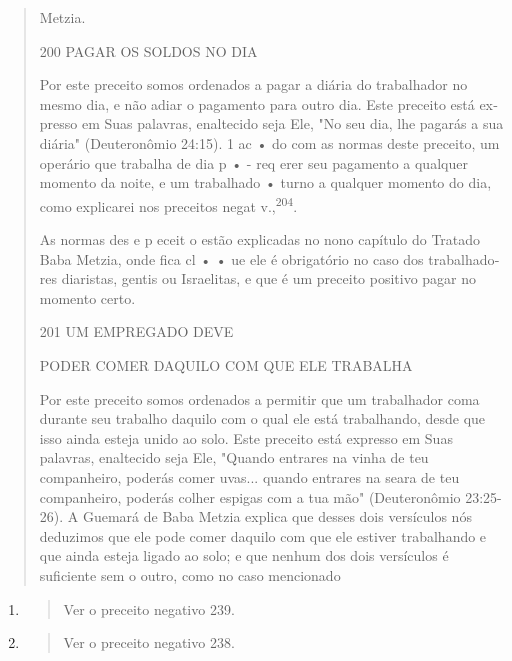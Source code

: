 \begin{quote}
Metzia.

200 PAGAR OS SOLDOS NO DIA

Por este preceito somos ordenados a pagar a diária do trabalhador no
mesmo dia, e não adiar o pagamento para outro dia. Este preceito está
ex­presso em Suas palavras, enaltecido seja Ele, "No seu dia, lhe
pagarás a sua diá­ria" (Deuteronômio 24:15). 1 ac • do com as normas
deste preceito, um ope­rário que trabalha de dia p • - req erer seu
pagamento a qualquer momento da noite, e um trabalhado • turno a
qualquer momento do dia, como expli­carei nos preceitos negat
v.,\textsuperscript{204}.

As normas des e p eceit o estão explicadas no nono capítulo do Tra­tado
Baba Metzia, onde fica cl • • ue ele é obrigatório no caso dos
trabalhado­res diaristas, gentis ou Israelitas, e que é um preceito
positivo pagar no momento certo.

201 UM EMPREGADO DEVE

PODER COMER DAQUILO COM QUE ELE TRABALHA

Por este preceito somos ordenados a permitir que um trabalhador coma
durante seu trabalho daquilo com o qual ele está trabalhando, desde que
isso ainda esteja unido ao solo. Este preceito está expresso em Suas
palavras, enaltecido seja Ele, "Quando entrares na vinha de teu
companheiro, poderás comer uvas... quando entrares na seara de teu
companheiro, poderás colher espigas com a tua mão" (Deuteronômio
23:25-26). A Guemará de Baba Metzia explica que desses dois versículos
nós deduzimos que ele pode comer daquilo com que ele estiver trabalhando
e que ainda esteja ligado ao solo; e que ne­nhum dos dois versículos é
suficiente sem o outro, como no caso mencionado
\end{quote}

\begin{enumerate}
\def\labelenumi{\arabic{enumi}.}
\setcounter{enumi}{202}
\item
  \begin{quote}
  Ver o preceito negativo 239.
  \end{quote}
\item
  \begin{quote}
  Ver o preceito negativo 238.
  \end{quote}
\end{enumerate}

